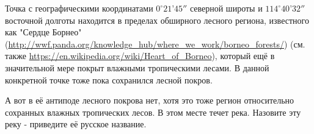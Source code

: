 
Точка с географическими координатами $0^{\circ}21’45''$ северной широты и $114^{\circ}40’32''$ 
восточной долготы находится в пределах обширного лесного региона, известного как "Сердце Борнео" (\url{http://wwf.panda.org/knowledge_hub/where_we_work/borneo_forests/})
 (см. также \url{https://en.wikipedia.org/wiki/Heart_of_Borneo}), который ещё в значительной мере покрыт влажными тропическими лесами. В данной конкретной точке тоже пока сохранился лесной покров.

А вот в её антиподе лесного покрова нет, хотя это тоже регион относительно сохранных влажных 
тропических лесов. В этом месте течет река. Назовите эту реку - приведите её русское название.

\soultionSection

